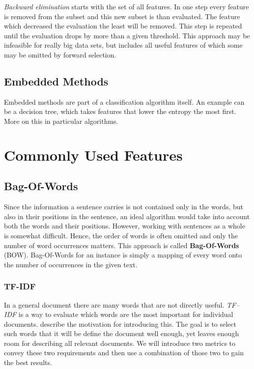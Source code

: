 {\it Backward elimination} starts with the set of all features. In one step every feature is removed from the subset and this new subset is than evaluated. The feature which decreased the evaluation the least will be removed. This step is repeated until the evaluation drops by more than a given threshold. This approach may be infeasible for really big data sets, but includes all useful features of which some may be omitted by forward selection.




\subsection{Embedded Methods}

Embedded methods are part of a classification algorithm itself. An example can be a decision tree, which takes features that lower the entropy the most first. More on this in particular algorithms.




\section{Commonly Used Features}

\subsection{Bag-Of-Words}

Since the information a sentence carries is not contained only in the words, but also in their positions in the sentence, an ideal algorithm would take into account both the words and their positions.
However, working with sentences as a whole is somewhat difficult. Hence, the order of words is often omitted and only the number of word occurrences matters.
This approach is called {\bf Bag-Of-Words} (BOW). Bag-Of-Words for an instance is simply a mapping of every word onto the number of occurrences in the given text.

\subsubsection{TF-IDF}

In a general document there are many words that are not directly useful.
{\it TF--IDF} is a way to evaluate which words are the most important for individual documents.  
\citet{SalBuc88} describe the motivation for introducing this.
The goal is to select such words that it will be define the document well enough, yet leaves enough room for describing all relevant documents.
We will introduce two metrics to convey these two requirements and then use a combination of those two to gain the best results.


